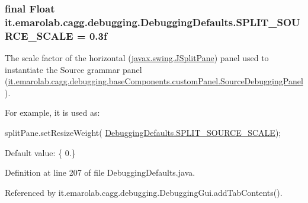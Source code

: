\hypertarget{classit_1_1emarolab_1_1cagg_1_1debugging_1_1DebuggingDefaults_aa08b19d8b87d4202ffb95a5166fdbe2a}{
\subsubsection[{S\-P\-L\-I\-T\-\_\-\-S\-O\-U\-R\-C\-E\-\_\-\-S\-C\-A\-L\-E}]{\setlength{\rightskip}{0pt plus 5cm}final Float it.\-emarolab.\-cagg.\-debugging.\-Debugging\-Defaults.\-S\-P\-L\-I\-T\-\_\-\-S\-O\-U\-R\-C\-E\-\_\-\-S\-C\-A\-L\-E = 0.\-3f\hspace{0.3cm}{\ttfamily [static]}}}\label{classit_1_1emarolab_1_1cagg_1_1debugging_1_1DebuggingDefaults_aa08b19d8b87d4202ffb95a5166fdbe2a}
The scale factor of the horizontal (\hyperlink{}{javax.\-swing.\-J\-Split\-Pane}) panel used to instantiate the Source grammar panel (\hyperlink{classit_1_1emarolab_1_1cagg_1_1debugging_1_1baseComponents_1_1customPanel_1_1SourceDebuggingPanel}{it.\-emarolab.\-cagg.\-debugging.\-base\-Components.\-custom\-Panel.\-Source\-Debugging\-Panel}).\par
 For example, it is used as\-:
\begin{DoxyCode}
splitPane.setResizeWeight( \hyperlink{classit_1_1emarolab_1_1cagg_1_1debugging_1_1DebuggingDefaults_aa08b19d8b87d4202ffb95a5166fdbe2a}{DebuggingDefaults.SPLIT\_SOURCE\_SCALE}); 
\end{DoxyCode}
 \par
 Default value\-: \{ 0.\} 

Definition at line 207 of file Debugging\-Defaults.\-java.



Referenced by it.\-emarolab.\-cagg.\-debugging.\-Debugging\-Gui.\-add\-Tab\-Contents().

